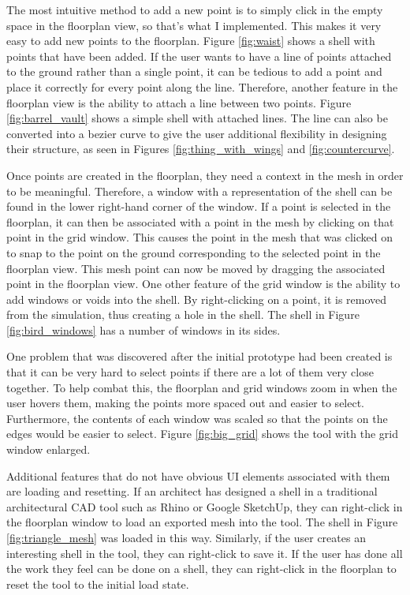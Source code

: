 \documentclass{thesis}
\begin{document}
The most intuitive method to add a new point is to simply click in the empty space in the floorplan view, so that's what
I implemented.  This makes it very easy to add new points to the floorplan.  Figure \ref{fig:waist} shows a shell with points that
have been added.  If the user wants to have a line of points attached to the ground rather than a single point, it can be tedious
to add a point and place it correctly for every point along the line.  Therefore, another feature in the floorplan view is the
ability to attach a line between two points.  Figure \ref{fig:barrel_vault} shows a simple shell with attached lines.  The line
can also be converted into a bezier curve to give the user additional flexibility in designing their structure, as seen in Figures
\ref{fig:thing_with_wings} and \ref{fig:countercurve}.

Once points are created in the floorplan, they need a context in the mesh in order to be meaningful.  Therefore, a window with
a representation of the shell can be found in the lower right-hand corner of the window.  If a point is selected in the
floorplan, it can then be associated with a point in the mesh by clicking on that point in the grid window.  This causes
the point in the mesh that was clicked on to snap to the point on the ground corresponding to the selected point in the
floorplan view.  This mesh point can now be moved by dragging the associated point in the floorplan view.  One other
feature of the grid window is the ability to add windows or voids into the shell.  By right-clicking on a point, it is
removed from the simulation, thus creating a hole in the shell.  The shell in Figure \ref{fig:bird_windows} has a number
of windows in its sides.

One problem that was discovered after the initial prototype had been created is that it can be very hard to select points if
there are a lot of them very close together.  To help combat this, the floorplan and grid windows zoom in when the user hovers
them, making the points more spaced out and easier to select.  Furthermore, the contents of each window was scaled so that the
points on the edges would be easier to select.  Figure \ref{fig:big_grid} shows the tool with the grid window enlarged.

Additional features that do not have obvious UI elements associated with them are loading and resetting.  If an architect has
designed a shell in a traditional architectural CAD tool such as Rhino or Google SketchUp, they can right-click in the floorplan
window to load an exported mesh into the tool.  The shell in Figure \ref{fig:triangle_mesh} was loaded in this way.  Similarly,
if the user creates an interesting shell in the tool, they can right-click to save it.  If the user has done all the work they
feel can be done on a shell, they can right-click in the floorplan to reset the tool to the initial load state.
\end{document}
